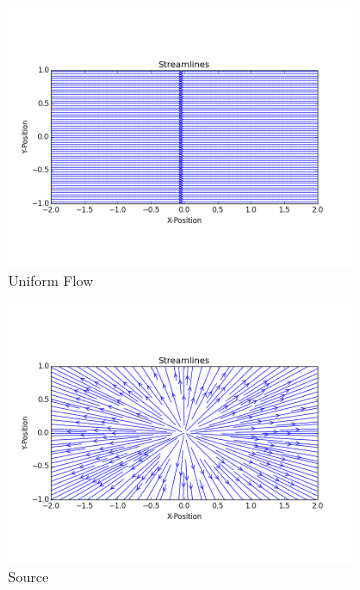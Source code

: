 \documentclass[10pt,a4paper]{article}
\begin{document}
\begin{figure}
\centering
\begin{subfigure}{0.32\textwidth}
    \includegraphics[width=1.0\textwidth]{Figures/Uniform}
  \caption{Uniform Flow}\label{F_Uniform_Flow}
\end{subfigure}
\hfill
\begin{subfigure}{0.32\textwidth}
    \includegraphics[width=1.0\textwidth]{Figures/Source}
  \caption{Source}\label{F_source}
\end{subfigure}
\hfill
\begin{subfigure}{0.32\textwidth}

\end{subfigure}
\end{figure}
\end{document}

